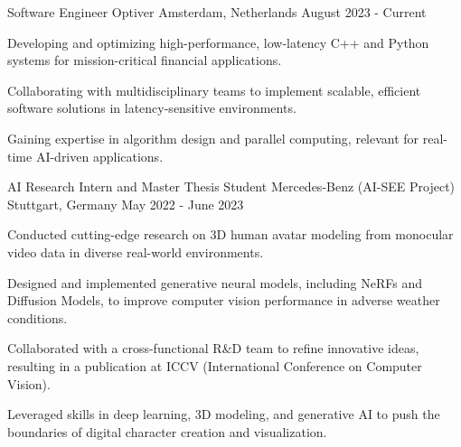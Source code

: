 
\begin{cventries}

  \cventry
    {Software Engineer} %
    {Optiver} %
    {Amsterdam, Netherlands} %
    {August 2023 - Current} %
    {
      \begin{cvitems} %
        \item {Developing and optimizing high-performance, low-latency C++ and Python systems for mission-critical financial applications.}
        \item {Collaborating with multidisciplinary teams to implement scalable, efficient software solutions in latency-sensitive environments.}
        \item {Gaining expertise in algorithm design and parallel computing, relevant for real-time AI-driven applications.}
      \end{cvitems}
    }

  \cventry
    {AI Research Intern and Master Thesis Student} %
    {Mercedes-Benz (AI-SEE Project)} %
    {Stuttgart, Germany} %
    {May 2022 - June 2023} %
    {
      \begin{cvitems} %
        \item {Conducted cutting-edge research on 3D human avatar modeling from monocular video data in diverse real-world environments.}
        \item {Designed and implemented generative neural models, including NeRFs and Diffusion Models, to improve computer vision performance in adverse weather conditions.}
        \item {Collaborated with a cross-functional R\&D team to refine innovative ideas, resulting in a publication at ICCV (International Conference on Computer Vision).}
        \item {Leveraged skills in deep learning, 3D modeling, and generative AI to push the boundaries of digital character creation and visualization.}
      \end{cvitems}
    }

\end{cventries}